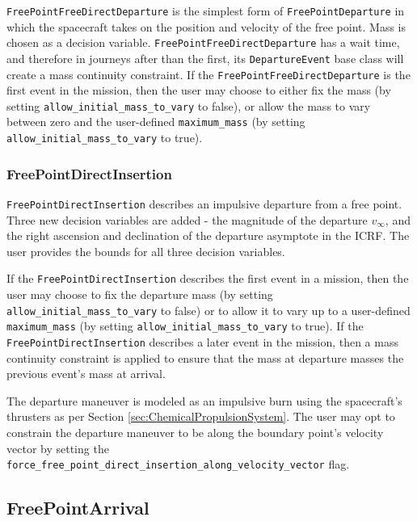 \texttt{FreePointFreeDirectDeparture} is the simplest form of \texttt{FreePointDeparture} in which the spacecraft takes on the position and velocity of the free point. Mass is chosen as a decision variable. \texttt{FreePointFreeDirectDeparture} has a wait time, and therefore in journeys after than the first, its \texttt{DepartureEvent} base class will create a mass continuity constraint. If the \texttt{FreePointFreeDirectDeparture} is the first event in the mission, then the user may choose to either fix the mass (by setting \texttt{allow\_initial\_mass\_to\_vary} to false), or allow the mass to vary between zero and the user-defined \texttt{maximum\_mass} (by setting \texttt{allow\_initial\_mass\_to\_vary} to true).

\subsubsection{FreePointDirectInsertion}
\label{subsubsec:FreePointDirectInsertion}

\texttt{FreePointDirectInsertion} describes an impulsive departure from a free point. Three new decision variables are added - the magnitude of the departure $v_\infty$, and the right ascension and declination of the departure asymptote in the \ac{ICRF}. The user provides the bounds for all three decision variables.

If the \texttt{FreePointDirectInsertion} describes the first event in a mission, then the user may choose to fix the departure mass (by setting \texttt{allow\_initial\_mass\_to\_vary} to false) or to allow it to vary up to a user-defined \texttt{maximum\_mass} (by setting \texttt{allow\_initial\_mass\_to\_vary} to true). If the \texttt{FreePointDirectInsertion} describes a later event in the mission, then a mass continuity constraint is applied to ensure that the mass at departure masses the previous event's mass at arrival.

The departure maneuver is modeled as an impulsive burn using the spacecraft's thrusters as per Section \ref{sec:ChemicalPropulsionSystem}. The user may opt to constrain the departure maneuver to be along the boundary point's velocity vector by setting the \texttt{force\_free\_point\_direct\_insertion\_along\_velocity\_vector} flag.

\subsection{FreePointArrival}
\label{subsec:FreePointArrival}

